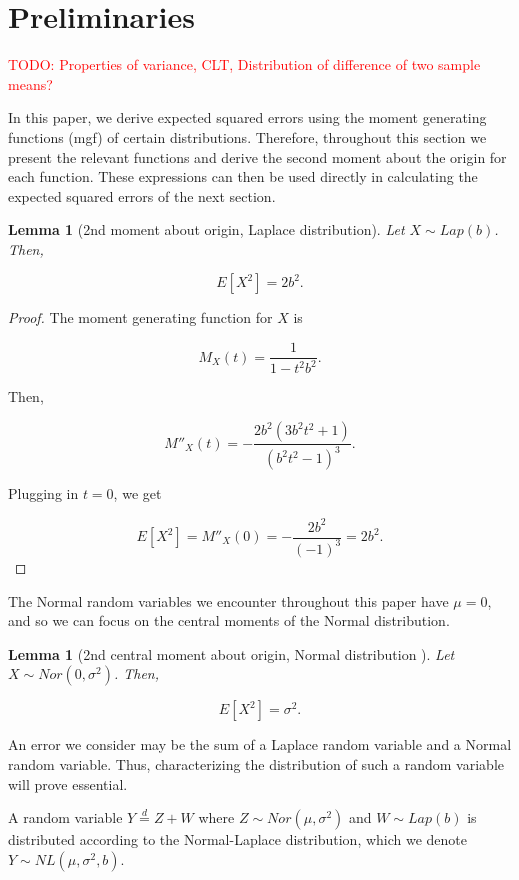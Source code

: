 \documentclass[sigconf]{acmart}
\newcommand{\todo}[1]{\textcolor{red}{TODO: {#1}}}
\theoremstyle{plain}
\newtheorem{lem}[thm]{Lemma}
\begin{document}
\section{Preliminaries}

\todo{Properties of variance, CLT, Distribution of difference of two sample means?}

In this paper, we derive expected squared errors using the moment generating functions (mgf) of certain distributions. Therefore, throughout this section we present the relevant functions and derive the second moment about the origin for each function. These expressions can then be used directly in calculating the expected squared errors of the next section. 

\begin{lem}[2nd moment about origin, Laplace distribution]
Let $X \sim Lap(b)$. Then, 

$$E[X^2] = 2b^2.$$
\end{lem}

\begin{proof}
The moment generating function for $X$ is 

$$M_X(t) = \frac{1}{1 - t^2b^2}.$$

Then,

$$M''_X(t) = -\frac{2b^2(3b^2t^2 + 1)}{(b^2t^2 - 1)^3}.$$

Plugging in $t = 0$, we get 

$$E[X^2] = M''_X(0) = -\frac{2b^2}{(-1)^3} = 2b^2.$$
\end{proof}

The Normal random variables we encounter throughout this paper have $\mu = 0$, and so we can focus on the central moments of the Normal distribution.

\begin{lem}[2nd central moment about origin, Normal distribution \cite{papoulis2002probability}]
Let $X \sim Nor(0, \sigma^2)$. Then,

$$E[X^2] = \sigma^2.$$
\end{lem}

An error we consider may be the sum of a Laplace random variable and a Normal random variable. Thus, characterizing the distribution of such a random variable will prove essential.

\begin{definition}
A random variable $Y \overset{d}{=} Z + W$ where $Z \sim Nor(\mu, \sigma^2)$ and $W \sim Lap(b)$ is distributed according to the Normal-Laplace distribution, which we denote $Y \sim NL(\mu, \sigma^2, b)$.
\end{definition}
\end{document}
